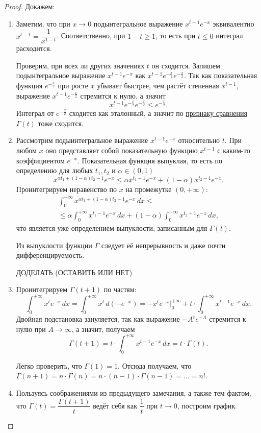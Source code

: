 \begin{proof}
	Докажем:
	\begin{enumerate}
		\item Заметим, что при \(x \to 0\) подынтегральное выражение \(x^{t - 1} e^{-x}\) эквивалентно \(x^{t - 1} = \dfrac{1}{x^{1 - t}}\). Соответственно, при \(1 - t \geqslant 1\), то есть при \(t \leqslant 0\) интеграл расходится.
		
		Проверим, при всех ли других значениях \(t\) он сходится. Запишем подынтегральное выражение \(x^{t - 1} e^{-x}\) как \(x^{t - 1} e^{-\frac{x}{2}} e^{-\frac{x}{2}}\). Так как показательная функция \(e^{-\frac{x}{2}}\) при росте \(x\) убывает быстрее, чем растёт степенная \(x^{t - 1}\), выражение \(x^{t - 1} e^{-\frac{x}{2}}\) стремится к нулю, а значит \[
			x^{t - 1} e^{-\frac{x}{2}} e^{-\frac{x}{2}} \leqslant  e^{-\frac{x}{2}}.
		\]
		Интеграл от \(e^{-\frac{x}{2}}\) сходится как эталонный, а значит по \hyperlink{priz}{признаку сравнения} \(\Gamma(t)\) тоже сходится.
		\item Рассмотрим подыинтегральное выражение \(x^{t - 1} e^{-x}\) относительно \(t\). При любом \(x\) оно представляет собой показательную функцию \(x^{t - 1}\) с каким-то коэффициентом \(e^{-x}\).
		Показательная функция выпуклая, то есть по определению для любых \(t_1, t_2\) и \(\alpha \in (0, 1)\) \[
			x^{\alpha t_1 + (1 - \alpha) t_2 - 1} e^{-x} \leqslant \alpha x^{t_1 - 1} e^{-x} + (1 - \alpha) x^{t_2 - 1} e^{-x}.
		\]
		Проинтегрируем неравенство по \(x\) на промежутке \((0, +\infty)\): 
		\begin{multline*}
			\int_0^{+\infty} x^{\alpha t_1 + (1 - \alpha) t_2 - 1} e^{-x} \, dx \leqslant \\
			\leqslant \alpha \int_0^{+\infty} x^{t_1 - 1} e^{-x} \, dx + (1 - \alpha) \int_0^{+\infty} x^{t_2 - 1} e^{-x} \, dx,
		\end{multline*}
		что является уже определением выпуклости, записанным для \(\Gamma(t)\).
		\begin{remark}
			Из выпуклости функции \(\Gamma\) следует её непрерывность и даже почти дифференцируемость.
			
			ДОДЕЛАТЬ (ОСТАВИТЬ ИЛИ НЕТ)
		\end{remark}
		\item Проинтегрируем \(\Gamma(t + 1)\) по частям: \[
			\int_{0}^{+\infty} x^t e^{-x} \, dx = \int_{0}^{+\infty} x^t \, d(-e^{-x}) = -x^t e^{-x} \bigg|_0^{+\infty} + t \cdot \int_{0}^{+\infty} x^{t - 1} e^{-x} \, dx.
		\]
		Двойная подстановка зануляется, так как выражение \(-A^t e^{-A}\) стремится к нулю при \(A \to \infty\), а значит, получаем \[
			\Gamma(t + 1) = t \cdot \int_{0}^{+\infty} x^{t - 1} e^{-x} \, dx = t \cdot \Gamma(t).
		\]
		\begin{remark}
			Легко проверить, что \(\Gamma(1) = 1\). Отсюда получаем, что \(\Gamma(n + 1) = n \cdot \Gamma(n) = n \cdot (n - 1) \cdot \Gamma(n - 1) = \ldots = n!\).
		\end{remark}
		\item Пользуясь соображениями из предыдущего замечания, а также тем фактом, что \(\Gamma(t) = \dfrac{\Gamma(t + 1)}{t}\) ведёт себя как \(\dfrac{1}{t}\) при \(t \to 0\), построим график.
		

\end{enumerate}
\end{proof}
